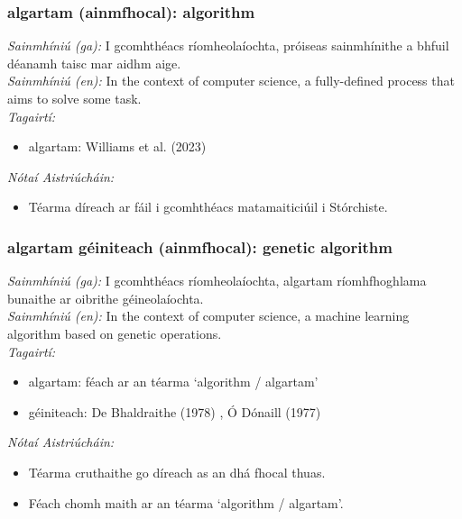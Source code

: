 \subsubsection*{algartam (ainmfhocal): algorithm}
 \noindent \textit{Sainmhíniú (ga):} I gcomhthéacs ríomheolaíochta, próiseas sainmhínithe a bhfuil déanamh taisc mar aidhm aige.
\\
 \noindent \textit{Sainmhíniú (en):} In the context of computer science, a fully-defined process that aims to solve some task.
\\
 \noindent \textit{Tagairtí:}
\begin{itemize}
	\item algartam: Williams et al. (2023) \cite{storchiste}
\end{itemize}

 \noindent \textit{Nótaí Aistriúcháin:}
\begin{itemize}
	\item Téarma díreach ar fáil i gcomhthéacs matamaiticiúil i Stórchiste.
\end{itemize}


\subsubsection*{algartam géiniteach (ainmfhocal): genetic algorithm}
 \noindent \textit{Sainmhíniú (ga):} I gcomhthéacs ríomheolaíochta, algartam ríomhfhoghlama bunaithe ar oibrithe géineolaíochta.
\\
 \noindent \textit{Sainmhíniú (en):} In the context of computer science, a machine learning algorithm based on genetic operations.
\\
 \noindent \textit{Tagairtí:}
\begin{itemize}
	\item algartam: féach ar an téarma `algorithm / algartam'
	\item géiniteach: De Bhaldraithe (1978) \cite{de-bhaldraithe}, Ó Dónaill (1977) \cite{odonaill}
\end{itemize}

 \noindent \textit{Nótaí Aistriúcháin:}
\begin{itemize}
	\item Téarma cruthaithe go díreach as an dhá fhocal thuas.
	\item Féach chomh maith ar an téarma `algorithm / algartam'.
\end{itemize}


